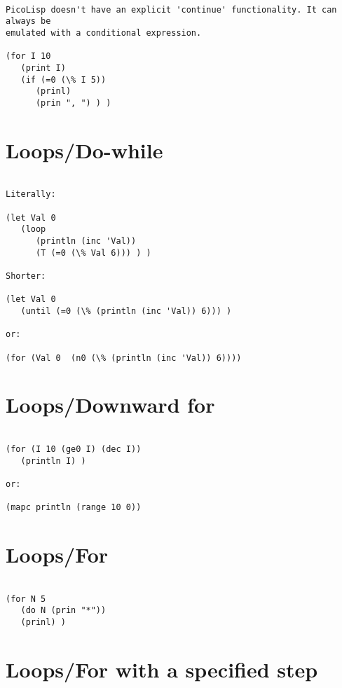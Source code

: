 \begin{verbatim}

PicoLisp doesn't have an explicit 'continue' functionality. It can always be
emulated with a conditional expression.

(for I 10
   (print I)
   (if (=0 (\% I 5))
      (prinl)
      (prin ", ") ) )

\end{verbatim}

\section*{Loops/Do-while}

\begin{verbatim}

Literally:

(let Val 0
   (loop
      (println (inc 'Val))
      (T (=0 (\% Val 6))) ) )

Shorter:

(let Val 0
   (until (=0 (\% (println (inc 'Val)) 6))) )

or:

(for (Val 0  (n0 (\% (println (inc 'Val)) 6))))

\end{verbatim}

\section*{Loops/Downward for}

\begin{verbatim}

(for (I 10 (ge0 I) (dec I))
   (println I) )

or:

(mapc println (range 10 0))

\end{verbatim}

\section*{Loops/For}

\begin{verbatim}

(for N 5
   (do N (prin "*"))
   (prinl) )

\end{verbatim}

\section*{Loops/For with a specified step}

